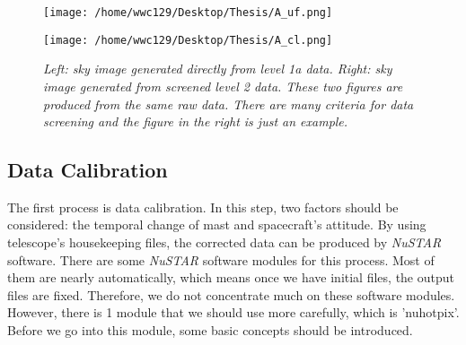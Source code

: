 \documentclass[12pt]{report}
\begin{document}
    \begin{figure}[h] 
      \vspace{0.2cm}
      \begin{minipage}{0.45\textwidth}
        \begin{flushright} 
          \texttt{[image: /home/wwc129/Desktop/Thesis/A\_uf.png]}
        \end{flushright}
      \end{minipage}
      \hspace{1cm}
      \begin{minipage}{0.45\textwidth}
        \begin{flushleft}
          \texttt{[image: /home/wwc129/Desktop/Thesis/A\_cl.png]}
        \end{flushleft} 
      \end{minipage}
      \centering
      \begin{minipage}[c]{0.85\textwidth}
          \caption{\textit{\footnotesize Left: sky image generated directly from level 1a data. Right: sky image 
          generated from screened level 2 data. These two figures are produced from the same raw data. There are 
          many criteria for data screening and the figure in the right is just an example.}}
      \end{minipage}
    \end{figure}
    
    \subsection{Data Calibration}   
        The first process is data calibration. In this step, two factors should be considered: the temporal change 
        of mast and spacecraft's attitude. By using telescope's housekeeping files, the corrected data can be 
        produced by \textit{NuSTAR} software. There are some \textit{NuSTAR} software modules for this process. Most of them are 
        nearly automatically, which means once we have initial files, the output files are fixed. Therefore, we 
        do not concentrate much on these software modules. However, there is 1 module that we should use more 
        carefully, which is 'nuhotpix'. Before we go into this module, some basic concepts should be introduced.
\end{document}
